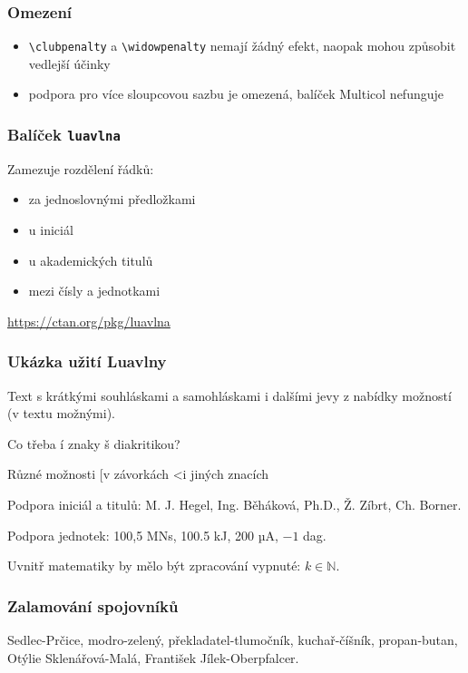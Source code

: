 \begin{frame}[fragile]
  \frametitle{Omezení}
    \begin{itemize}
      \item \verb|\clubpenalty| a \verb|\widowpenalty| nemají žádný efekt, naopak mohou způsobit vedlejší účinky
      \item  podpora pro více sloupcovou sazbu je omezená, balíček Multicol nefunguje
  \end{itemize}
\end{frame}
 

\begin{frame}[fragile]
  \frametitle{Balíček \texttt{luavlna}}
    Zamezuje rozdělení řádků:
      \begin{itemize}
        \item za jednoslovnými předložkami
        \item u iniciál
        \item u akademických titulů
        \item mezi čísly a jednotkami
      \end{itemize}
  \url{https://ctan.org/pkg/luavlna}
\end{frame}

\begin{frame}
  \frametitle{Ukázka užití Luavlny}
  \begin{minipage}{3in}

    \preventsingledebugon

    Text s krátkými souhláskami a samohláskami i dalšími jevy
    z nabídky možností (v textu možnými).

    Co třeba í znaky š diakritikou?

    Různé možnosti [v závorkách \textless i jiných znacích

    Podpora iniciál a titulů: M. J. Hegel, Ing. Běháková, Ph.D., Ž. Zíbrt,
    Ch. Borner.

    Podpora jednotek: 100,5 MN\cdot{}s, 100.5 kJ, 200 µA, $-1$ dag.

    Uvnitř matematiky by mělo být zpracování vypnuté: $k \in \mathbb N$.

    \preventsingledebugoff
  \end{minipage}
\end{frame}

\begin{frame}
    \frametitle{Zalamování spojovníků}
    \begin{center}
    \begin{minipage}{2in}
      Sedlec-Prčice, modro-zelený, překladatel-tlumočník, kuchař-číšník, propan-butan, Otýlie Sklenářová-Malá, František Jílek-Oberpfalcer.
    \end{minipage}
  \end{center}
\end{frame}

